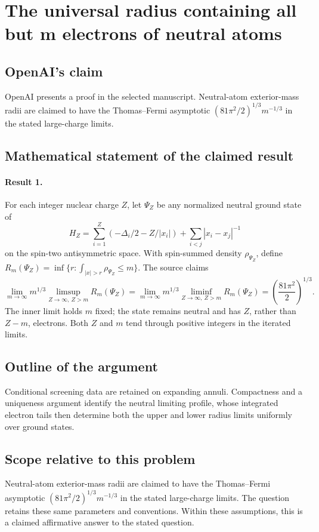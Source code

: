 \documentclass[11pt]{article}
\begin{document}
\section*{The universal radius containing all but m electrons of neutral atoms}

\subsection{OpenAI's claim}
OpenAI presents a proof in the selected manuscript. Neutral-atom exterior-mass radii are claimed to have the Thomas--Fermi asymptotic $(81\pi^2/2)^{1/3}m^{-1/3}$ in the stated large-charge limits.

\subsection{Mathematical statement of the claimed result}
\paragraph{Result 1.} For each integer nuclear charge \(Z\), let \(\Psi_Z\) be any normalized neutral ground state of
\[
 H_Z=\sum_{i=1}^Z(-\Delta_i/2-Z/|x_i|)+\sum_{i<j}|x_i-x_j|^{-1}
\]
on the spin-two antisymmetric space. With spin-summed density \(\rho_{\Psi_Z}\), define \(R_m(\Psi_Z)=\inf\{r:\int_{|x|>r}\rho_{\Psi_Z}\le m\}\). The source claims
\[
 \lim_{m\to\infty}m^{1/3}\limsup_{Z\to\infty,\ Z>m}R_m(\Psi_Z)
 =\lim_{m\to\infty}m^{1/3}\liminf_{Z\to\infty,\ Z>m}R_m(\Psi_Z)
 =\left(\frac{81\pi^2}{2}\right)^{1/3}.
\]
The inner limit holds \(m\) fixed; the state remains neutral and has \(Z\), rather than \(Z-m\), electrons. Both $Z$ and $m$ tend through positive integers in the iterated limits.

\subsection{Outline of the argument}
Conditional screening data are retained on expanding annuli. Compactness and a uniqueness argument identify the neutral limiting profile, whose integrated electron tails then determine both the upper and lower radius limits uniformly over ground states.

\subsection{Scope relative to this problem}
Neutral-atom exterior-mass radii are claimed to have the Thomas--Fermi asymptotic $(81\pi^2/2)^{1/3}m^{-1/3}$ in the stated large-charge limits. The question retains these same parameters and conventions. Within these assumptions, this is a claimed affirmative answer to the stated question.
\end{document}
